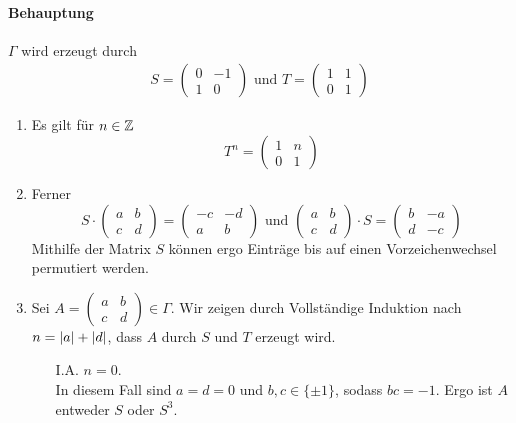 \documentclass{book}
\begin{document}
\paragraph{Behauptung}
$\Gamma$ wird erzeugt durch
\begin{align*}
S =
\left(\begin{matrix}
0 & -1 \\
1 & 0
\end{matrix}\right)
\text{ und }
T  =
\left(\begin{matrix}
1 & 1 \\
0 & 1
\end{matrix}\right)
\end{align*}
\begin{Beweis}{}
	\begin{enumerate}[1.]
		\item Es gilt für $n \in \mathbb{Z}$
		\[ T^n = \left(\begin{matrix}
		1 & n \\
		0 & 1
		\end{matrix}\right) \]
		\item Ferner
		\[ S \cdot \left(\begin{matrix}
		a & b\\
		c & d
		\end{matrix}\right) = \left(\begin{matrix}
		-c & -d\\
		a & b
		\end{matrix}\right)
		\text{ und }
		\left(\begin{matrix}
		a & b\\
		c & d
		\end{matrix}\right)\cdot S   = \left(\begin{matrix}
		b & -a\\
		d & -c
		\end{matrix}\right)\]
		Mithilfe der Matrix $S$ können ergo Einträge bis auf einen Vorzeichenwechsel permutiert werden.
		\item Sei $A = \left(\begin{matrix}
		a & b\\
		c & d
		\end{matrix}\right) \in \Gamma$. Wir zeigen durch Vollständige Induktion nach $n = \left|a\right| + \left|d\right|$, dass $A$ durch $S$ und $T$ erzeugt wird.
		\begin{enumerate}
			\item[I.A.] $n = 0$.\\
			In diesem Fall sind $a = d = 0$ und $b,c\in \{\pm 1\}$, sodass $bc = -1$. Ergo ist $A$ entweder $S$ oder $S^3$.

\end{enumerate}
\end{enumerate}
\end{Beweis}
\end{document}
